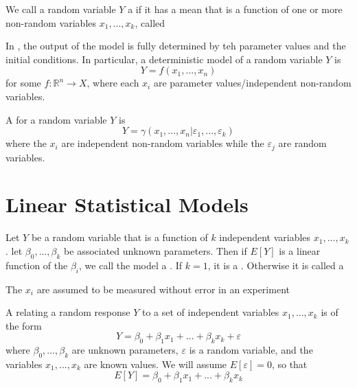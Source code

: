 \documentclass[12pt, a4paper, twoside, openright, titlepage]{book}
\begin{document}
\begin{defn}{}{}
    We call a random variable $Y$ a  if it has a mean that is a function of one or more non-random variables $x_1,...,x_k$, called 
\end{defn}

\begin{defn}{}{}
    In , the output of the model is fully determined by teh parameter values and the initial conditions. In particular, a deterministic model of a random variable $Y$ is \begin{equation*}
        Y = f(x_1,...,x_n)
    \end{equation*}
    for some $f:\mathbb{R}^n\rightarrow X$, where each $x_i$ are parameter values/independent non-random variables.
\end{defn}

\begin{defn}{}{}
    A  for a random variable $Y$ is \begin{equation*}
        Y = \gamma(x_1,...,x_n\vert\varepsilon_1,...,\varepsilon_k)
    \end{equation*}
    where the $x_i$ are independent non-random variables while the $\varepsilon_j$ are random variables.
\end{defn}


\section{\textsection Linear Statistical Models}


\begin{defn}{}{}
    Let $Y$ be a random variable that is a function of $k$ independent variables $x_1,...,x_k$. let $\beta_0,...,\beta_k$ be associated unknown parameters. Then if $E[Y]$ is a linear function of the $\beta_i$, we call the model a . If $k=1$, it is a . Otherwise it is called a 
\end{defn}

\begin{note}{}{}
    The $x_i$ are assumed to be measured without error in an experiment
\end{note}

\begin{defn}{}{}
    A  relating a random response $Y$ to a set of independent variables $x_1,...,x_k$ is of the form \begin{equation*}
        Y = \beta_0 + \beta_1x_1 + ...+ \beta_kx_k + \varepsilon
    \end{equation*}
    where $\beta_0,...,\beta_k$ are unknown parameters, $\varepsilon$ is a random variable, and the variables $x_1,...,x_k$ are known values. We will assume $E[\varepsilon] = 0$, so that \begin{equation*}
        E[Y] = \beta_0 + \beta_1x_1 + ...+ \beta_kx_k
    \end{equation*}
\end{defn}
\end{document}
